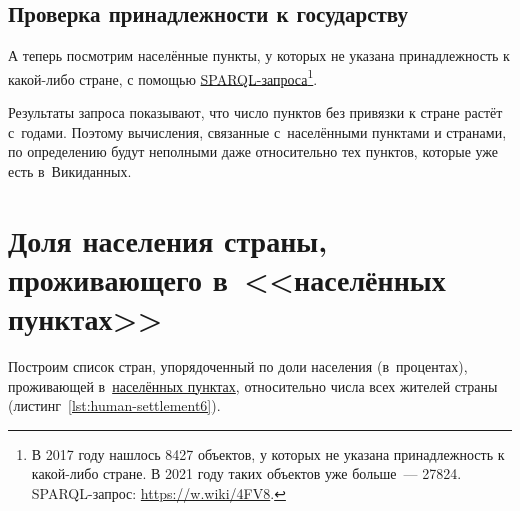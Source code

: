 \subsection{Проверка принадлежности к государству}

А теперь посмотрим населённые пункты, 
у которых не указана принадлежность к какой-либо стране, 
с помощью \href{https://w.wiki/4FV8}{SPARQL-запроса}\footnote{%
%
    В 2017 году нашлось \num{8427} объектов, у которых не указана принадлежность к какой-либо стране. 
    В 2021 году таких объектов уже больше~--- \num{27824}. SPARQL-запрос: \href{https://w.wiki/4FV8}{https://w.wiki/4FV8}.%
}. 

Результаты запроса показывают, что число пунктов без привязки к стране растёт с~годами. 
Поэтому вычисления, связанные с~населёнными пунктами и странами, 
по определению будут неполными даже относительно тех пунктов, которые уже есть в~Викиданных. 



\section{Доля населения страны, проживающего в~<<населённых пунктах>>}

Построим список стран, 
упорядоченный по доли населения (в~процентах), проживающей в~\href{http://www.wikidata.org/entity/Q486972}{населённых пунктах}, относительно числа всех жителей страны (листинг~\ref{lst:human-settlement6}).


